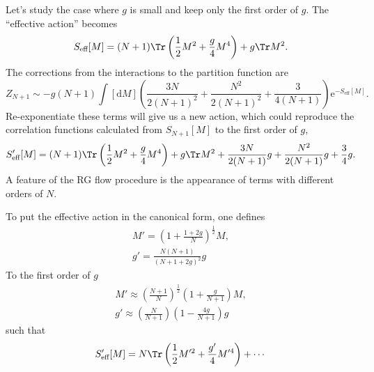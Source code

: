 Let's study the case where $g$ is small and keep only the first order of $g$.
The ``effective action'' becomes
\[
	S_{\text{eff}}[M] = (N+1) \Tr \left( \frac{1}{2} M^2 + \frac{g}{4} M^4 \right)  + g \Tr M^2 \\
.\] 
The corrections from the interactions to the partition function are
\[
	Z_{N+1} \sim -g (N+1)\int [\mathrm{d} M] \left(\frac{3N}{2(N+1)^{2}} 
	+ \frac{N^2}{2(N+1)^2} + \frac{3}{4(N+1)} \right) \mathrm{e}^{- S_{\text{eff}}[M]} 
.\] 
Re-exponentiate these terms will give us a new action,
which could reproduce the correlation functions calculated from $S_{N+1}[M]$ to the first order of $g$,
\[
	S'_{\text{eff}}[M] = (N+1) \Tr \left( \frac{1}{2} M^2 + \frac{g}{4} M^4 \right) + g \Tr M^2 + \frac{3N}{2(N+1)} g
	+ \frac{N^2}{2(N+1)} g + \frac{3}{4} g
.\] 
A feature of the RG flow procedure is the appearance of terms with different orders of $N$.

To put the effective action in the canonical form, one defines
\begin{align*}
	M' = \left( 1 + \frac{1 + 2g}{N} \right)^{\frac{1}{2}} M,\\
	g' = \frac{N(N+1)}{(N+1+2g)^2} g
\end{align*}
To the first order of $g$
\begin{align*}
	M' \approx \left( \frac{N+1}{N} \right)^{\frac{1}{2}} \left( 1 + \frac{g}{N+1} \right) M,\\
g' \approx \left( \frac{N}{N+1} \right) \left( 1 - \frac{4g}{N+1} \right) g  
\end{align*}
such that
\begin{equation}
	S'_{\text{eff}}[M] = N \Tr \left( \frac{1}{2} M'^2 + \frac{g'}{4} M'^4 \right) + \cdots 	
\end{equation}

